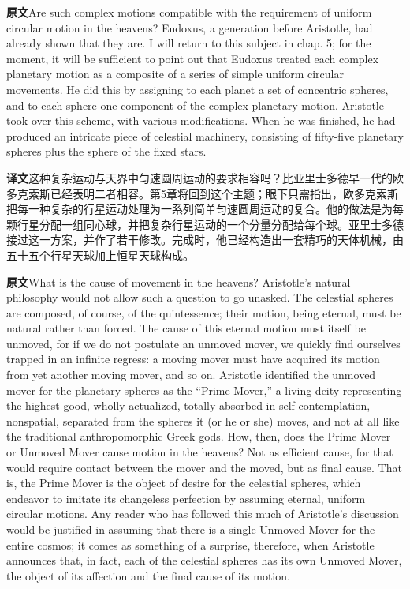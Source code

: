 \documentclass[UTF8,zihao=-4]{ctexart}
\newcommand{\BodyFont}{\fontsize{10.5pt}{15.5pt}\selectfont}
\newcommand{\origlabel}{\textbf{原文}\quad}
\newcommand{\translabel}{\textbf{译文}\quad}
\newcommand{\orig}{\par\noindent\begingroup\BodyFont\origlabel}
\newcommand{\zhline}[1]{\par\endgroup\noindent\begingroup\BodyFont\translabel #1\par\endgroup\vspace{0.35em}}
\begin{document}
\orig Are such complex motions compatible with the requirement of uniform circular motion in the heavens? Eudoxus, a generation before Aristotle, had already shown that they are. I will return to this subject in chap. 5; for the moment, it will be sufficient to point out that Eudoxus treated each complex planetary motion as a composite of a series of simple uniform circular movements. He did this by assigning to each planet a set of concentric spheres, and to each sphere one component of the complex planetary motion. Aristotle took over this scheme, with various modifications. When he was finished, he had produced an intricate piece of celestial machinery, consisting of fifty-five planetary spheres plus the sphere of the fixed stars.

\zhline{这种复杂运动与天界中匀速圆周运动的要求相容吗？比亚里士多德早一代的欧多克索斯已经表明二者相容。第5章将回到这个主题；眼下只需指出，欧多克索斯把每一种复杂的行星运动处理为一系列简单匀速圆周运动的复合。他的做法是为每颗行星分配一组同心球，并把复杂行星运动的一个分量分配给每个球。亚里士多德接过这一方案，并作了若干修改。完成时，他已经构造出一套精巧的天体机械，由五十五个行星天球加上恒星天球构成。}

\orig What is the cause of movement in the heavens? Aristotle's natural philosophy would not allow such a question to go unasked. The celestial spheres are composed, of course, of the quintessence; their motion, being eternal, must be natural rather than forced. The cause of this eternal motion must itself be unmoved, for if we do not postulate an unmoved mover, we quickly find ourselves trapped in an infinite regress: a moving mover must have acquired its motion from yet another moving mover, and so on. Aristotle identified the unmoved mover for the planetary spheres as the ``Prime Mover,'' a living deity representing the highest good, wholly actualized, totally absorbed in self-contemplation, nonspatial, separated from the spheres it (or he or she) moves, and not at all like the traditional anthropomorphic Greek gods. How, then, does the Prime Mover or Unmoved Mover cause motion in the heavens? Not as efficient cause, for that would require contact between the mover and the moved, but as final cause. That is, the Prime Mover is the object of desire for the celestial spheres, which endeavor to imitate its changeless perfection by assuming eternal, uniform circular motions. Any reader who has followed this much of Aristotle's discussion would be justified in assuming that there is a single Unmoved Mover for the entire cosmos; it comes as something of a surprise, therefore, when Aristotle announces that, in fact, each of the celestial spheres has its own Unmoved Mover, the object of its affection and the final cause of its motion.
\end{document}
